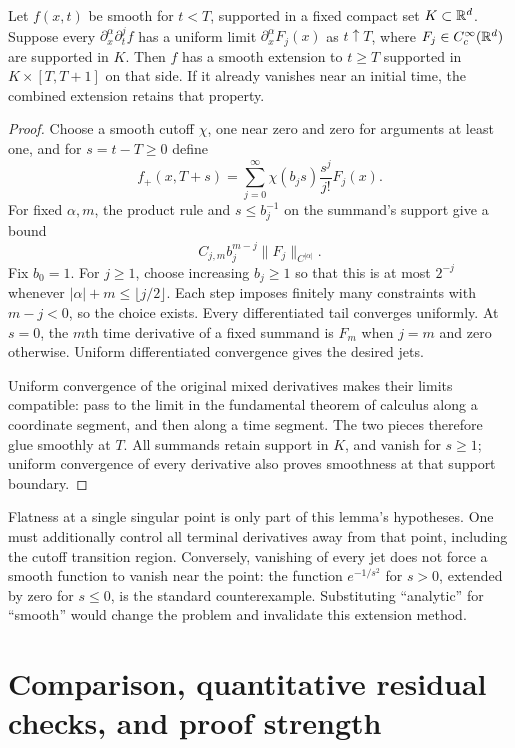 \begin{lemma}
\label{lem:ns-terminal-jets}
Let $f(x,t)$ be smooth for $t<T$, supported in a fixed compact set
$K\subset\mathbb{R}^d$. Suppose every $\partial_x^\alpha\partial_t^jf$
has a uniform limit $\partial_x^\alpha F_j(x)$ as $t\uparrow T$,
where $F_j\in C_c^\infty(\mathbb{R}^d)$ are supported in $K$.
Then $f$ has a smooth extension to $t\geq T$ supported in
$K\times[T,T+1]$ on that side. If it already vanishes near an initial
time, the combined extension retains that property.
\end{lemma}
\begin{proof}
Choose a smooth cutoff $\chi$, one near zero and zero for arguments
at least one, and for $s=t-T\geq0$ define
\[
 f_+(x,T+s)=\sum_{j=0}^\infty\chi(b_js)\frac{s^j}{j!}F_j(x).
\]
For fixed $\alpha,m$, the product rule and $s\leq b_j^{-1}$ on the
summand's support give a bound
\[
 C_{j,m}b_j^{m-j}\|F_j\|_{C^{|\alpha|}}.
\]
Fix $b_0=1$. For $j\geq1$, choose increasing $b_j\geq1$ so that this is at most $2^{-j}$ whenever
$|\alpha|+m\leq\lfloor j/2\rfloor$. Each step imposes finitely many
constraints with $m-j<0$, so the choice exists. Every differentiated tail
converges uniformly. At $s=0$, the $m$th time derivative of a fixed
summand is $F_m$ when $j=m$ and zero otherwise. Uniform differentiated
convergence gives the desired jets.

Uniform convergence of the original mixed derivatives makes their limits
compatible: pass to the limit in the fundamental theorem of calculus
along a coordinate segment, and then along a time segment. The two
pieces therefore glue smoothly at $T$. All summands retain support in
$K$, and vanish for $s\geq1$; uniform convergence of every derivative
also proves smoothness at that support boundary.
\end{proof}

Flatness at a single singular point is only part of this lemma's hypotheses.
One must additionally control all terminal derivatives away from that point,
including the cutoff transition region. Conversely, vanishing of every jet
does not force a smooth function to vanish near the point: the function
$e^{-1/s^2}$ for $s>0$, extended by zero for $s\leq0$, is the standard
counterexample. Substituting ``analytic'' for ``smooth'' would change the
problem and invalidate this extension method.

\section{Comparison, quantitative residual checks, and proof strength}


